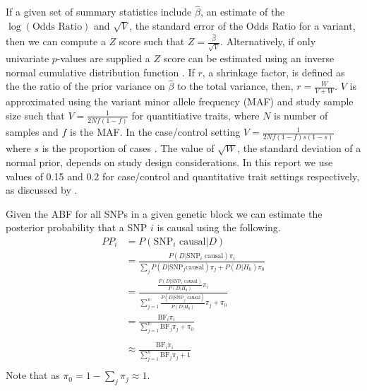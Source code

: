 \documentclass[a4paper,11pt]{report}
\begin{document}
If a given set of summary statistics include $\hat{\beta}$, an  estimate of the $\log(\text{Odds Ratio})$ and $\sqrt{V}$, the standard error of the Odds Ratio for a variant, then we can compute a $Z$ score such that $Z= \frac{\hat{\beta}}{\sqrt{V}}$. Alternatively, if only univariate $p$-values are supplied a $Z$ score can be estimated using an inverse normal cumulative distribution function . If $r$, a shrinkage factor, is defined as the  the ratio of the prior variance on $\hat{\beta}$ to the total variance, then, $r = \frac{W}{V + W}$. $V$ is approximated using the variant minor allele frequency (MAF) and study sample size such that $V=\frac{1}{2Nf(1-f)}$ for quantitiative traits, where $N$ is number of samples and $f$ is the MAF. In the case/control setting $V=\frac{1}{2Nf(1-f)s(1-s)}$ where $s$ is the proportion of cases . The value of $\sqrt{W}$, the standard deviation of a normal prior, depends on study design considerations. In this report we use values of 0.15 and 0.2 for  case/control  and quantitative trait settings  respectively, as discussed by \citet{GiambartolomeiVukcevicSchadtEtAl2014}.

Given the ABF for all SNPs in a given genetic block we can estimate the posterior probability that a SNP $i$  is causal using the following. 
\begin{equation}
\label{form:bf_derivation}
\begin{split}
	PP_{i}& = P(\text{SNP}_{i}\text{ causal} | D)\\
	& = \frac{P(D | \text{SNP}_{i} \text{ causal})\pi_{i}}{\sum_{j}P(D | \text{SNP}_{j}\text{causal})\pi_{j} + P(D | H_{0})\pi_0}\\
	& = \frac{
				\frac{
					P(D | \text{SNP}_{i}\text{ causal})
				}
				{
					P(D|H_{0})
				}\pi_{i}
		}
		{
				\sum_{j=1}^n\frac{
					P(D | \text{SNP}_{j}\text{ causal})
				}
				{
					P(D|H_{0})
				}\pi_{j}  + \pi_0
		}	\\
	& = \frac{
		\text{BF}_{i}\pi_{i}
	}
	{
	\sum_{j=1}^n\text{BF}_{j}\pi_{j} + \pi_{0}
	} \\	
	\\
	& \approx \frac{
		\text{BF}_{i}\pi_{i}
	}
	{
	\sum_{j=1}^n\text{BF}_{j}\pi_{j} + 1
	} \\
\end{split}
\end{equation}
Note that as $\pi_{0} = 1-\sum_{j}\pi_{j} \approx 1$. 
\end{document}
